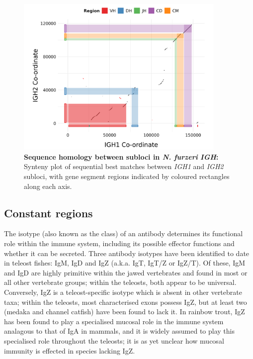 	\begin{figure}
	\centering
	\includegraphics[width=0.9\textwidth]{_Figures/png/nfu-locus-dots.png}
	\caption[Sequence homology between subloci in \textit{N. furzeri} \textit{IGH}]{\textbf{Sequence homology between subloci in \textit{N. furzeri} \textit{IGH}:} Synteny plot of sequential best matches between \textit{IGH1} and \textit{IGH2} subloci, with gene segment regions indicated by coloured rectangles along each axis.}
	\label{fig:nfu-locus-synteny}
	\end{figure}
	
	\subsection{Constant regions}
	\label{sec:nfu-locus-constant}
	
	The isotype (also known as the class) of an antibody determines its functional role within the immune system, including its possible effector functions and whether it can be secreted. Three antibody isotypes have been identified to date in teleost fishes: IgM, IgD and IgZ (a.k.a. IgT, IgT/Z or IgZ/T). Of these, IgM and IgD are highly primitive within the jawed vertebrates and found in most or all other vertebrate groups; within the teleosts, both appear to be universal. Conversely, IgZ is a teleost-specific isotype which is absent in other vertebrate taxa; within the teleosts, most characterised exons possess IgZ, but at least two (medaka and channel catfish) have been found to lack it. In rainbow trout, IgZ has been found to play a specialised mucosal role in the immune system analagous to that of IgA in mammals, and it is widely assumed to play this specialised role throughout the teleosts; it is as yet unclear how mucosal immunity is effected in species lacking IgZ.
	
